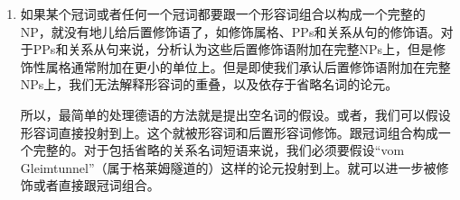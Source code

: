 \begin{enumerate}
\item 如果某个冠词或者任何一个冠词都要跟一个形容词组合以构成一个完整的NP，就没有地儿给后置修饰语了，如修饰属格、PPs和关系从句的修饰语。对于PPs和关系从句来说，分析认为这些后置修饰语附加在完整NPs上\citep{Kiss2005a}，但是修饰性属格通常附加在更小的单位上。但是即使我们承认后置修饰语附加在完整NPs上，我们无法解释形容词的重叠，以及依存于省略名词的论元。
 
所以，最简单的处理德语的方法就是提出空名词的假设。或者，我们可以假设形容词直接投射到\nbar 上。这个\nbar 就被形容词和后置形容词修饰。跟冠词组合构成一个完整的\nbar 。对于包括省略的关系名词短语来说，我们必须要假设“vom Gleimtunnel”（属于格莱姆隧道的）这样的论元投射到\nbar 上。\nbar 就可以进一步被修饰或者直接跟冠词组合。


\end{enumerate}
